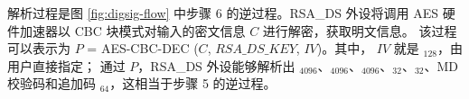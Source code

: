 \documentclass[main\_\_CN.tex]{subfiles}
\begin{document}
\begin{enumerate}
        解析过程是图 \ref{fig:digsig-flow} 中步骤 6 的逆过程。RSA\_DS 外设将调用 AES 硬件加速器以 CBC 块模式对输入的密文信息 \begin{math}C\end{math} 进行解密，获取明文信息。
        该过程可以表示为
        \begin{math}P\end{math} = AES-CBC-DEC (\begin{math}C\end{math}, \begin{math}RSA\_DS\_KEY\end{math}, \begin{math}IV\end{math})。其中， \begin{math}IV\end{math} 就是 \begin{math}[IV]_{128}\end{math}，由用户直接指定； 
        通过 \begin{math}P\end{math}，RSA\_DS 外设能够解析出 \begin{math}[Y]_{4096}\end{math}、\begin{math}[M]_{4096}\end{math}、\begin{math}[\overline{r}]_{4096}\end{math}、\begin{math}[M^{\prime}]_{32}\end{math}、\begin{math}[L]_{32}\end{math}、MD 校验码和追加码 \begin{math}[\beta]_{64} \end{math}，这相当于步骤 5 的逆过程。


\end{enumerate}
\end{document}
